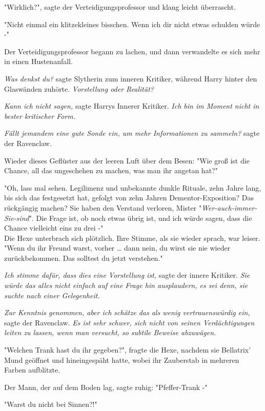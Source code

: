 {"Wirklich?", sagte der Verteidigungsprofessor und klang leicht überrascht.

"Nicht einmal ein klitzekleines bisschen. Wenn ich dir nicht etwas schulden würde -"

Der Verteidigungsprofessor begann zu lachen, und dann verwandelte es sich mehr in einen Hustenanfall.

\emph{Was denkst du?} sagte Slytherin zum inneren Kritiker, während Harry hinter den Glaswänden zuhörte. \emph{Vorstellung oder Realität?}

\emph{Kann ich nicht sagen,} sagte Harrys Innerer Kritiker. \emph{Ich bin im Moment nicht in bester kritischer Form.}

\emph{Fällt jemandem eine gute Sonde ein, um mehr Informationen zu sammeln?} sagte der Ravenclaw.

Wieder dieses Geflüster aus der leeren Luft über dem Besen: "Wie groß ist die Chance, all das ungeschehen zu machen, was man ihr angetan hat?"

"Oh, lass mal sehen. Legilimenz und unbekannte dunkle Rituale, zehn Jahre lang, bis sich das festgesetzt hat, gefolgt von zehn Jahren Dementor-Exposition? Das rückgängig machen? Sie haben den Verstand verloren, Mister "\emph{Wer-auch-immer-Sie-sind}". Die Frage ist, ob noch etwas übrig ist, und ich würde sagen, dass die Chance vielleicht eins zu drei -"\\ Die Hexe unterbrach sich plötzlich. Ihre Stimme, als sie wieder sprach, war leiser.\\ "Wenn du ihr Freund warst, vorher … dann nein, du wirst sie nie wieder zurückbekommen. Das solltest du jetzt verstehen."

\emph{Ich stimme dafür, dass dies eine Vorstellung ist,} sagte der innere Kritiker. \emph{Sie würde das alles nicht einfach auf eine Frage hin ausplaudern, es sei denn, sie suchte nach einer Gelegenheit.}

\emph{Zur Kenntnis genommen, aber ich schätze das als wenig vertrauenswürdig ein,} sagte der Ravenclaw. \emph{Es ist sehr schwer, sich nicht von seinen Verdächtigungen leiten zu lassen, wenn man versucht, so subtile Beweise abzuwägen.}

"Welchen Trank hast du ihr gegeben?", fragte die Hexe, nachdem sie Bellatrix' Mund geöffnet und hineingespäht hatte, wobei ihr Zauberstab in mehreren Farben aufblitzte.

Der Mann, der auf dem Boden lag, sagte ruhig: "Pfeffer-Trank -"

"Warst du nicht bei Sinnen?!"

}

